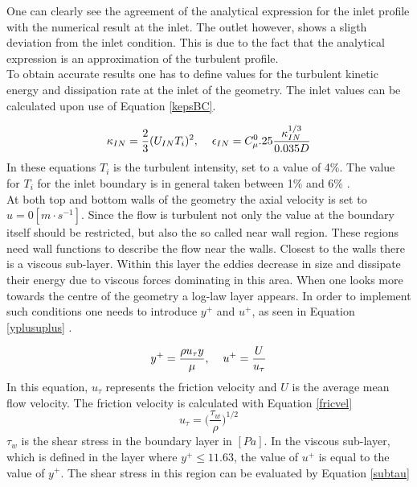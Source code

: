 \documentclass{CFD2017}
\begin{document}

One can clearly see the agreement of the analytical expression for the inlet profile with the numerical result at the inlet. The outlet however, shows a sligth deviation from the inlet condition. This is due to the fact that the analytical expression is an approximation of the turbulent profile.\\
To obtain accurate results one has to define values for the turbulent kinetic energy and dissipation rate at the inlet of the geometry. The inlet values can be calculated upon use of Equation \ref{kepsBC}.

\begin{equation}
\label{kepsBC}
\kappa_{IN}=\frac{2}{3}(U_{IN}T_i)^2,\hspace{4mm}\epsilon_{IN}=C_{\mu}^0.25\frac{\kappa_{IN}^{1/3}}{0.035 D}
\end{equation}
In these equations $T_i$ is the turbulent intensity, set to a value of 4\%. The value for $T_i$ for the inlet boundary is in general taken between 1\% and 6\% \cite{Versteeg2007}.\\
At both top and bottom walls of the geometry the axial velocity is set to $u=0[m\cdot s^{-1}]$. Since the flow is turbulent not only the value at the boundary itself should be restricted, but also the so called near wall region. These regions need wall functions to describe the flow near the walls. Closest to the walls there is a viscous sub-layer. Within this layer the eddies decrease in size and dissipate their energy due to viscous forces dominating in this area. When one looks more towards the centre of the geometry a log-law layer appears. In order to implement such conditions one needs to introduce $y^+$ and $u^+$, as seen in Equation \ref{yplusuplus} \cite{Versteeg2007}.

\begin{equation}
\label{yplusuplus}
y^+=\frac{\rho u_{\tau}y}{\mu},\hspace{4mm}u^+=\frac{U}{ u_{\tau}}
\end{equation}
In this equation, $ u_{\tau}$ represents the friction velocity and $U$ is the average mean flow velocity. The friction velocity is calculated with Equation \ref{fricvel}
\begin{equation}
\label{fricvel}
u_{\tau}=\big(\frac{\tau_w}{\rho}\big)^{1/2}
\end{equation}
$\tau_w$ is the shear stress in the boundary layer in $[Pa]$. In the viscous sub-layer, which is defined in the layer where $y^+\leq 11.63$, the value of $u^+$ is equal to the value of $y^+$. The shear stress in this region can be evaluated by Equation \ref{subtau}
\end{document}
